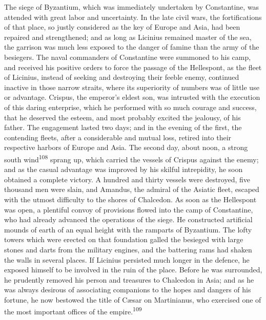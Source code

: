 
The siege of Byzantium, which was immediately undertaken by
Constantine, was attended with great labor and uncertainty. In
the late civil wars, the fortifications of that place, so justly
considered as the key of Europe and Asia, had been repaired and
strengthened; and as long as Licinius remained master of the sea,
the garrison was much less exposed to the danger of famine than
the army of the besiegers. The naval commanders of Constantine
were summoned to his camp, and received his positive orders to
force the passage of the Hellespont, as the fleet of Licinius,
instead of seeking and destroying their feeble enemy, continued
inactive in those narrow straits, where its superiority of
numbers was of little use or advantage. Crispus, the emperor’s
eldest son, was intrusted with the execution of this daring
enterprise, which he performed with so much courage and success,
that he deserved the esteem, and most probably excited the
jealousy, of his father. The engagement lasted two days; and in
the evening of the first, the contending fleets, after a
considerable and mutual loss, retired into their respective
harbors of Europe and Asia. The second day, about noon, a strong
south wind\textsuperscript{108} sprang up, which carried the vessels of Crispus
against the enemy; and as the casual advantage was improved by
his skilful intrepidity, he soon obtained a complete victory. A
hundred and thirty vessels were destroyed, five thousand men were
slain, and Amandus, the admiral of the Asiatic fleet, escaped
with the utmost difficulty to the shores of Chalcedon. As soon as
the Hellespont was open, a plentiful convoy of provisions flowed
into the camp of Constantine, who had already advanced the
operations of the siege. He constructed artificial mounds of
earth of an equal height with the ramparts of Byzantium. The
lofty towers which were erected on that foundation galled the
besieged with large stones and darts from the military engines,
and the battering rams had shaken the walls in several places. If
Licinius persisted much longer in the defence, he exposed himself
to be involved in the ruin of the place. Before he was
surrounded, he prudently removed his person and treasures to
Chalcedon in Asia; and as he was always desirous of associating
companions to the hopes and dangers of his fortune, he now
bestowed the title of Cæsar on Martinianus, who exercised one of
the most important offices of the empire.\textsuperscript{109}

